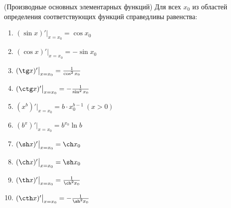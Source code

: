\begin{theorem} (Производные основных элементарных функций)
	Для всех $x_0$ из областей определения соответствующих
	функций справедливы равенства:
	\begin{enumerate}
		\item $(\sin x)' \big|_{x = x_0} = \cos x_0$
		\item $(\cos x)' \big|_{x = x_0} = -\sin x_0$
		\item $(\tg x)' \big|_{x = x_0} = \frac{1}{\cos^2 x_0}$
		\item $(\ctg x)' \big|_{x = x_0} = -\frac{1}{\sin^2 x_0}$
		\item $(x^b)' \big|_{x = x_0} = b \cdot x_0^{b - 1}\ (x > 0)$
		\item $(b^x)' \big|_{x = x_0} = b^{x_0} \ln b$
		\item $(\sh x)' \big|_{x = x_0} = \ch x_0$
		\item $(\ch x)' \big|_{x = x_0} = \sh x_0$
		\item $(\th x)' \big|_{x = x_0} = \frac{1}{\ch^2 x_0}$
		\item $(\cth x)' \big|_{x = x_0} = -\frac{1}{\sh^2 x_0}$
	\end{enumerate}
\end{theorem}

